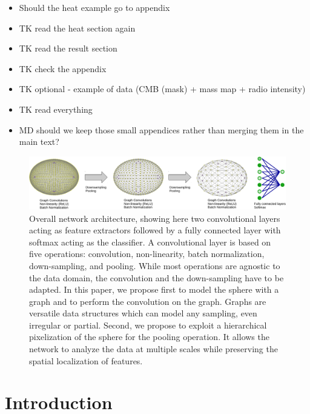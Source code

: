 \documentclass[final,twocolumn,3p,times,authoryear]{elsarticle}
\newcommand{\nati}[1]{{\color[rgb]{.1,.6,.1}{#1}}}
\newcommand{\1}{\b{1}}              %
\newcommand{\0}{\b{0}}              %
\begin{document}
\begin{itemize}[noitemsep,topsep=0pt,parsep=0pt,partopsep=0pt]
    \item Should the heat example go to appendix
    \item TK read the heat section again
    \item TK read the result section
    \item TK check the appendix
    \item TK optional - example of data (CMB (mask) + mass map + radio intensity)
    \item TK read everything
	\item MD should we keep those small appendices rather than merging them in the main text?
\end{itemize}

\begin{figure}[!ht]
	\centering
	\includegraphics[width=\linewidth]{figures/architecture}
	\caption{Overall network architecture, showing here two convolutional layers acting as feature extractors followed by a fully connected layer with softmax acting as the classifier. A convolutional layer is based on five operations: convolution, non-linearity, batch normalization, down-sampling, and pooling. While most operations are agnostic to the data domain, the convolution and the down-sampling have to be adapted. In this paper, we propose first to model the sphere with a graph and to perform the convolution on the graph. Graphs are versatile data structures which can model any sampling, even irregular or partial. Second, we propose to exploit a hierarchical pixelization of the sphere for the pooling operation. It allows the network to analyze the data at multiple scales while preserving the spatial localization of features.
    \nati{Great plot! Could you make the sphere round? If you use the current code in paper plot notebook, they will be.}
    }
	\label{fig:architecture}
\end{figure}

\section{Introduction}
\label{sec:intro}

\end{document}
